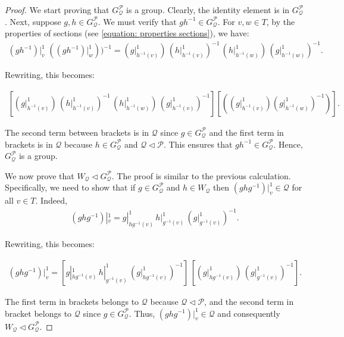 \documentclass{amsart}
\begin{document}
\begin{proof}
We start proving that $G_\mathcal{Q}^\mathcal{P}$ is a group. Clearly, the identity element is in $G_\mathcal{Q}^\mathcal{P}$. Next, suppose $g,h \in G_\mathcal{Q}^\mathcal{P}$. We must verify that $gh^{-1} \in G_\mathcal{Q}^\mathcal{P}$. For $v,w \in T$, by the properties of sections (see \cref{equation: properties sections}), we have:
\begin{align*}
(gh^{-1})|_v^1 \, \, ((gh^{-1})|_w^1))^{-1} = (g|_{h^{-1}(v)}^1) \, (h|_{h^{-1}(v)}^1)^{-1} \, (h|_{h^{-1}(w)}^1) \,  (g|_{h^{-1}(w)}^1)^{-1}.
\end{align*}

Rewriting, this becomes:

\begin{align*}
\left[ (g|_{h^{-1}(v)}^1) \, (h|_{h^{-1}(v)}^1)^{-1} \, (h|_{h^{-1}(w)}^1) \, (g|_{h^{-1}(v)}^1)^{-1} \right]  \left[ ((g|_{h^{-1}(v)}^1)  (g|_{h^{-1}(w)}^1)^{-1}) \right].
\end{align*}

The second term between brackets is in $\mathcal{Q}$ since $g \in G_\mathcal{Q}^\mathcal{P}$ and the first term in brackets is in $\mathcal{Q}$ because $h \in G_\mathcal{Q}^\mathcal{P}$ and $\mathcal{Q} \lhd \mathcal{P}$. This ensures that $gh^{-1} \in G_\mathcal{Q}^\mathcal{P}$. Hence, $G_\mathcal{Q}^\mathcal{P}$ is a group.

We now prove that $W_\mathcal{Q} \lhd G_\mathcal{Q}^\mathcal{P}$. The proof is similar to the previous calculation. Specifically, we need to show that if $g \in G_\mathcal{Q}^\mathcal{P}$ and $h \in W_\mathcal{Q}$ then $(ghg^{-1})|_v^1 \in \mathcal{Q}$ for all $v \in T$. Indeed,
\begin{align*}
(ghg^{-1})|_v^1 = g|_{hg^{-1}(v)}^1 \, h|_{g^{-1}(v)}^1 \, (g|_{g^{-1}(v)}^1)^{-1}.
\end{align*}

Rewriting, this becomes:

\begin{align*}
 (ghg^{-1})|_v^1 = \left[ g|_{hg^{-1}(v)}^1 \, h|_{g^{-1}(v)}^1 \, (g|_{hg^{-1}(v)}^1)^{-1} \right] \, \left[ (g|_{hg^{-1}(v)}^1) \, (g|_{g^{-1}(v)}^1)^{-1} \right].  
\end{align*}

The first term in brackets belongs to $\mathcal{Q}$ because $\mathcal{Q} \lhd \mathcal{P}$, and the second term in bracket belongs to $\mathcal{Q}$ since $g \in G_\mathcal{Q}^\mathcal{P}$. Thus, $(ghg^{-1})|_v^1 \in \mathcal{Q}$ and consequently $W_\mathcal{Q} \lhd G_\mathcal{Q}^\mathcal{P}$.


\end{proof}
\end{document}
